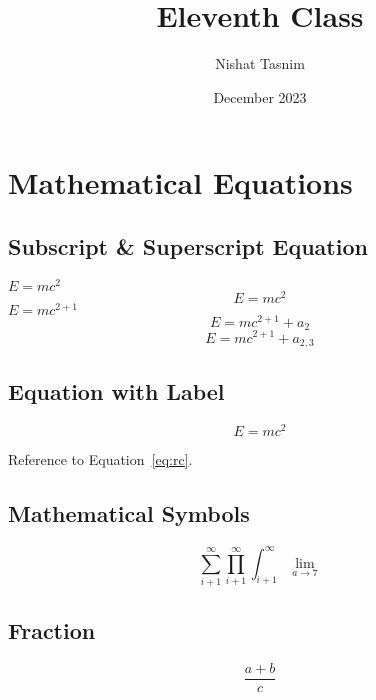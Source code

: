 \documentclass{article}
\title{Eleventh Class}
\author{Nishat Tasnim}
\date{December 2023}
\begin{document}
\section{Mathematical Equations}

\subsection{Subscript \& Superscript Equation}
$E = mc^2$
$$E = mc^2$$
$E = mc^{2+1}$
$$ E = mc^{2+1} + a_2 $$
$$ E = mc^{2+1} + a_{2,3} $$

\subsection{Equation with Label}
\begin{equation}
    E = mc^2
    \label{eq:rc}
\end{equation}

Reference to Equation~\ref{eq:rc}.

\subsection{Mathematical Symbols}
\begin{equation}
    \sum_{i+1}^{\infty}
    \prod_{i+1}^{\infty}
    \int_{i+1}^{\infty}
    \lim_{{a \to 7}}
\end{equation}

\subsection{Fraction}
\begin{equation}
    \frac{a+b}{c}
\end{equation}
\end{document}

